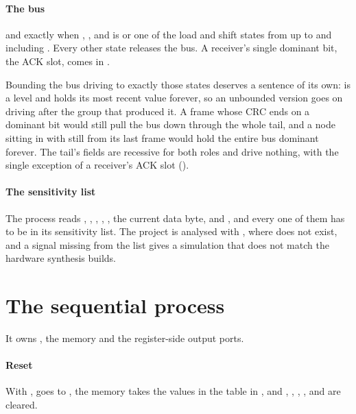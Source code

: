 \paragraph{The bus}
 and  exactly when , ,
and  is  or one of the load and shift states from
 up to and including . Every other state releases the bus.
A receiver's single dominant bit, the ACK slot, comes in .

\begin{warning}
Bounding the bus driving to exactly those states deserves a sentence of its own:
 is a level and holds its most recent value forever, so an unbounded version goes
on driving after the group that produced it. A frame whose CRC ends on a dominant bit would still
pull the bus down through the whole tail, and a node sitting in  with 
still  from its last frame would hold the entire bus dominant forever. The tail's fields
are recessive for both roles and drive nothing, with the single exception of a receiver's ACK slot
().
\end{warning}

\paragraph{The sensitivity list}
The process reads , , , , , the
current data byte,  and , and every one of them has to be in its
sensitivity list. The project is analysed with , where  does not
exist, and a signal missing from the list gives a simulation that does not match the hardware
synthesis builds.

\section{The sequential process}
\label{c16:sec:seq}

It owns , the memory and the register-side output ports.

\paragraph{Reset}
With ,  goes to , the memory takes the values in
the table in , and , , ,
,  and  are cleared.

